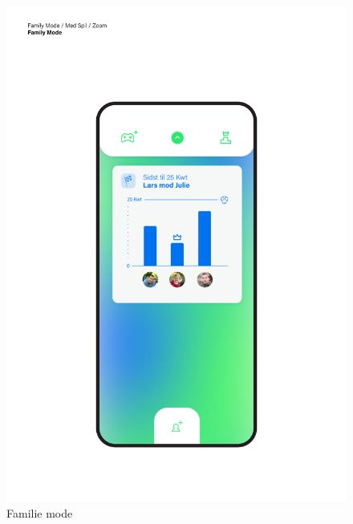 \begin{figure}
    \centering
    \includegraphics[width=\textwidth]{Images/appendixC/Familie.png}
    \caption{Familie mode}
    \label{img:mockup:family}
\end{figure}


